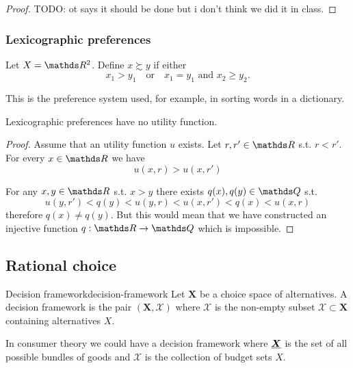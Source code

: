 \documentclass[12pt]{extarticle}
\renewcommand{\vec}[1]{\uvec{#1}}
\begin{document}
\begin{proof}
	TODO: ot says it should be done but i don't think we did it in class.
\end{proof}

\subsubsection{Lexicographic preferences}

Let $X = \R^2$. Define $x \succsim y$ if either
\begin{equation}
	x_1 > y_1 \quad \text{or} \quad x_1 = y_1 \text{ and } x_2 \geq y_2.
\end{equation}

This is the preference system used, for example, in sorting words in a dictionary.

\begin{proposition}{}{}
	Lexicographic preferences have no utility function.
\end{proposition}

\begin{proof}
	Assume that an utility function $u$ exists.
	Let $r, r' \in \R$ s.t. $r < r'$.
	For every $x \in \R$ we have
	\begin{equation}
		u(x, r) > u(x, r')
	\end{equation}

	For any $x, y \in \R$ s.t. $x > y$ there exists $q(x), q(y) \in \Q$ s.t.
	\begin{equation}
		u(y, r') < q(y) < u(y, r) < u(x, r') < q(x) < u(x, r)
	\end{equation}
	therefore $q(x) \ne q(y)$.
	But this would mean that we have constructed an injective function $q : \R \to \Q$ which is impossible.
\end{proof}

\subsection{Rational choice}

\begin{definition}{Decision framework}{decision-framework}
	Let $\bm X$ be a choice space of alternatives.
	A decision framework is the pair $(\bm X,\mathcal X)$
	where $\mathcal X$ is the non-empty subset $\mathcal X \subset \bm X$ containing alternatives $X$.
\end{definition}

In consumer theory we could have a decision framework where $\vec X$ is the set of all possible bundles of goods and $\mathcal X$ is the collection of budget sets $X$.
\end{document}
